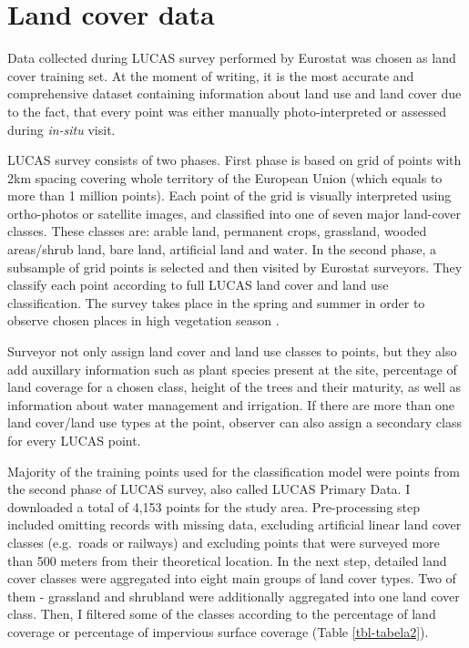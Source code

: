 \documentclass{amuthesis}
\begin{document}
\hypertarget{sec-landcover}{%
\section{Land cover data}\label{sec-landcover}}

Data collected during LUCAS survey performed by Eurostat was chosen as
land cover training set. At the moment of writing, it is the most
accurate and comprehensive dataset containing information about land use
and land cover \autocite{pflugmacher_mapping_2019} due to the fact, that
every point was either manually photo-interpreted or assessed during
\emph{in-situ} visit.

LUCAS survey consists of two phases. First phase is based on grid of
points with 2km spacing covering whole territory of the European Union
(which equals to more than 1 million points). Each point of the grid is
visually interpreted using ortho-photos or satellite images, and
classified into one of seven major land-cover classes. These classes
are: arable land, permanent crops, grassland, wooded areas/shrub land,
bare land, artificial land and water. In the second phase, a subsample
of grid points is selected and then visited by Eurostat surveyors. They
classify each point according to full LUCAS land cover and land use
classification. The survey takes place in the spring and summer in order
to observe chosen places in high vegetation season
\autocite{dandrimont_harmonised_2020}.

Surveyor not only assign land cover and land use classes to points, but
they also add auxillary information such as plant species present at the
site, percentage of land coverage for a chosen class, height of the
trees and their maturity, as well as information about water management
and irrigation. If there are more than one land cover/land use types at
the point, observer can also assign a secondary class for every LUCAS
point.

Majority of the training points used for the classification model were
points from the second phase of LUCAS survey, also called LUCAS Primary
Data. I downloaded a total of 4,153 points for the study area.
Pre-processing step included omitting records with missing data,
excluding artificial linear land cover classes (e.g.~roads or railways)
and excluding points that were surveyed more than 500 meters from their
theoretical location. In the next step, detailed land cover classes were
aggregated into eight main groups of land cover types. Two of them -
grassland and shrubland were additionally aggregated into one land cover
class. Then, I filtered some of the classes according to the percentage
of land coverage or percentage of impervious surface coverage (Table
\ref{tbl-tabela2}).
\end{document}
